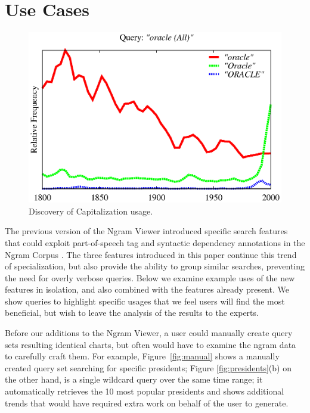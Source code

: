 \documentclass[11pt,a4paper]{article}
\begin{document}
\section{Use Cases}
\label{sec:usecases}
\begin{figure}
\centering

\includegraphics[width=\columnwidth]{graphs/oracle}
\caption{\label{fig:apple} Discovery of Capitalization usage.}

\end{figure}

The previous version of the Ngram Viewer introduced specific search features that could exploit part-of-speech tag and syntactic dependency annotations in the Ngram Corpus \cite{lin2012syntactic}. The three features introduced in this paper continue this trend of specialization, but also provide the ability to group similar searches, preventing the need for overly verbose queries. Below we examine example uses of the new features in isolation, and also combined with the features already present. We show queries to highlight specific usages that we feel users will find the most beneficial, but wish to leave the analysis of the results to the experts.

Before our additions to the Ngram Viewer, a user could manually create query sets resulting identical charts, but often would have to examine the ngram data to carefully craft them. For example, Figure~\ref{fig:manual} shows a manually created query set searching for specific presidents; Figure \ref{fig:presidents}(b) on the other hand, is a single wildcard query over the same time range; it automatically retrieves the 10 most popular presidents and shows additional trends that would have required extra work on behalf of the user to generate.
\end{document}
